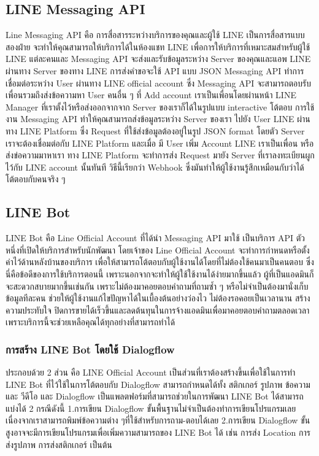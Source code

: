 \subsection{LINE Messaging API} 
\quad Line Messaging API คือ การสื่อสารระหว่างบริการของคุณและผู้ใช้ LINE เป็นการสื่อสารแบบสองฝ่าย จะทำให้คุณสามารถให้บริการได้ในห้องแชท LINE เพื่อการให้บริการที่เหมาะสมสำหรับผู้ใช้ LINE แต่ละคนและ Messaging API จะส่งและรับข้อมูลระหว่าง Server ของคุณและแอพ LINE ผ่านทาง Server ของทาง LINE การส่งคำขอจะใช้ API แบบ JSON Messaging API ทำการเชื่อมต่อระหว่าง User ผ่านทาง LINE official account ซึ่ง Messaging API จะสามารถตอบรับเพื่อนรวมถึงส่งข้อความหา User คนอื่น ๆ ที่ Add account เราเป็นเพื่อนโดยผ่านหน้า LINE Manager ที่เราตั้งไว้หรือส่งออกจากจาก Server ของเราก็ได้ในรูปแบบ interactive โต้ตอบ  การใช้งาน Messaging API ทำให้คุณสามารถส่งข้อมูลระหว่าง Server ของเรา ไปยัง User LINE ผ่านทาง LINE Platform ซึ่ง Request ที่ใช้ส่งข้อมูลต้องอยู่ในรูป JSON format โดยตัว Server เราจะต้องเชื่อมต่อกับ LINE Platform และเมื่อ มี User เพิ่ม Account LINE เราเป็นเพื่อน หรือ ส่งข่อความมาหาเรา ทาง LINE Platform จะทำการส่ง Request มายัง Server ที่เราลงทะเบียนผูกไว้กับ LINE account นั้นทันที วิธีนี้เรียกว่า Webhook ซึ่งมันทำให้ผู้ใช้งานรู้สึกเหมือนกับว่าได้โต้ตอบกับคนจริง ๆ 
\cite{lineAPI}
\subsection{LINE Bot} 
\quad LINE Bot คือ Line Official Account ที่ได้นำ Messaging API มาใช้ เป็นบริการ API ตัวหนึ่งที่เปิดให้บริการสำหรับนักพัฒนา โดยเจ้าของ Line Official Account จะทำการกำหนดหรือตั้งค่าไว้ด้านหลังบ้านของบริการ เพื่อให้สามารถโต้ตอบกับผู้ใช้งานได้โดยที่ไม่ต้องใช้คนมาเป็นคนตอบ ซึ่งนี่คือข้อดีของการใช้บริการตอนนี้ เพราะนอกจากจะทำให้ผู้ใช้ใช้งานได้ง่ายมากขึ้นแล้ว ผู้ที่เป็นแอดมินก็จะสะดวกสบายมากขึ้นเช่นกัน เพราะไม่ต้องมาคอยตอบคำถามที่ถามซ้ำ ๆ หรือไม่จำเป็นต้องมานั่งเก็บข้อมูลทีละคน ช่วยให้ผู้ใช้งานแก้ไขปัญหาได้ในเบื้องต้นอย่างว่องไว ไม่ต้องรอคอยเป็นเวลานาน สร้างความประทับใจ ปิดการขายได้เร็วขึ้นและลดต้นทุนในการจ้างแอดมินเพื่อมาคอยตอบคำถามตลอดเวลา เพราะบริการนี้จะช่วยเหลือคุณได้ทุกอย่างที่สามารถทำได้ 
\subsubsection{การสร้าง LINE Bot โดยใช้ Dialogflow} 
\quad ประกอบด้วย 2 ส่วน คือ LINE Official Account เป็นส่วนที่เราต้องสร้างขึ้นเพื่อใช้ในการทำ LINE Bot ที่ไว้ใช้ในการโต้ตอบกับ Dialogflow สามารถกำหนดได้ทั้ง สติกเกอร์ รูปภาพ ข้อความ และ วีดีโอ และ Dialogflow เป็นแพลตฟอร์มที่สามารถช่วยในการพัฒนา LINE Bot ได้สามารถแบ่งได้ 2 กรณีดังนี้ 1.การเขียน Dialogflow ขั้นพื้นฐานไม่จำเป็นต้องทำการเขียนโปรแกรมเลย เนื่องจากเราสามารถพิมพ์ข้อความต่าง ๆที่ใช้สำหรับการถาม-ตอบได้เลย 2.การเขียน Dialogflow ขั้นสูงอาจจะมีการเขียนโปรแกรมเพื่อเพิ่มความสามารถของ LINE Bot ได้ เช่น การส่ง Location การส่งรูปภาพ การส่งสติกเกอร์ เป็นต้น 
\cite{lineBot} \cite{lineDf} \cite{lineDfPyFb}
